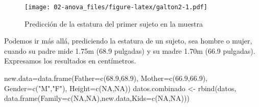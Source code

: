 \documentclass[
]{book}
\newenvironment{Shaded}{\begin{snugshade}}{\end{snugshade}}
\newcommand{\AttributeTok}[1]{\textcolor[rgb]{0.77,0.63,0.00}{#1}}
\newcommand{\ConstantTok}[1]{\textcolor[rgb]{0.00,0.00,0.00}{#1}}
\newcommand{\FloatTok}[1]{\textcolor[rgb]{0.00,0.00,0.81}{#1}}
\newcommand{\FunctionTok}[1]{\textcolor[rgb]{0.00,0.00,0.00}{#1}}
\newcommand{\NormalTok}[1]{#1}
\newcommand{\OtherTok}[1]{\textcolor[rgb]{0.56,0.35,0.01}{#1}}
\newcommand{\StringTok}[1]{\textcolor[rgb]{0.31,0.60,0.02}{#1}}
\begin{document}
\begin{figure}
\centering
\texttt{[image: 02-anova\_files/figure-latex/galton2-1.pdf]}
\caption{\label{fig:galton2}Predicción de la estatura del primer sujeto en la muestra}
\end{figure}

Podemos ir más allá, prediciendo la estatura de un sujeto, sea hombre o mujer, cuando su padre mide 1.75m (68.9 pulgadas) y su madre 1.70m (66.9 pulgadas). Expresamos los resultados en centímetros.

\begin{Shaded}
\begin{Highlighting}[]
\NormalTok{new.data}\OtherTok{=}\FunctionTok{data.frame}\NormalTok{(}\AttributeTok{Father=}\FunctionTok{c}\NormalTok{(}\FloatTok{68.9}\NormalTok{,}\FloatTok{68.9}\NormalTok{),}
                    \AttributeTok{Mother=}\FunctionTok{c}\NormalTok{(}\FloatTok{66.9}\NormalTok{,}\FloatTok{66.9}\NormalTok{),}
                    \AttributeTok{Gender=}\FunctionTok{c}\NormalTok{(}\StringTok{"M"}\NormalTok{,}\StringTok{"F"}\NormalTok{),}
                    \AttributeTok{Height=}\FunctionTok{c}\NormalTok{(}\ConstantTok{NA}\NormalTok{,}\ConstantTok{NA}\NormalTok{))}
\NormalTok{datos.combinado }\OtherTok{\textless{}{-}} \FunctionTok{rbind}\NormalTok{(datos, }\FunctionTok{data.frame}\NormalTok{(}\AttributeTok{Family=}\FunctionTok{c}\NormalTok{(}\ConstantTok{NA}\NormalTok{,}\ConstantTok{NA}\NormalTok{),new.data,}\AttributeTok{Kids=}\FunctionTok{c}\NormalTok{(}\ConstantTok{NA}\NormalTok{,}\ConstantTok{NA}\NormalTok{)))}


\end{Highlighting}
\end{Shaded}
\end{document}
